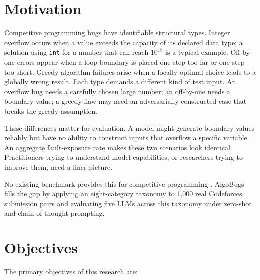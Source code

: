 \section{Motivation}

Competitive programming bugs have identifiable structural types. Integer overflow occurs when a value exceeds the capacity of its declared data type; a solution using \texttt{int} for a number that can reach $10^{18}$ is a typical example. Off-by-one errors appear when a loop boundary is placed one step too far or one step too short. Greedy algorithm failures arise when a locally optimal choice leads to a globally wrong result. Each type demands a different kind of test input. An overflow bug needs a carefully chosen large number; an off-by-one needs a boundary value; a greedy flaw may need an adversarially constructed case that breaks the greedy assumption.

These differences matter for evaluation. A model might generate boundary values reliably but have no ability to construct inputs that overflow a specific variable. An aggregate fault-exposure rate makes these two scenarios look identical. Practitioners trying to understand model capabilities, or researchers trying to improve them, need a finer picture.

No existing benchmark provides this for competitive programming \cite{yang2025testcase, cao2025tcgbench, dong2024survey}. AlgoBugs fills the gap by applying an eight-category taxonomy to 1,000 real Codeforces submission pairs and evaluating five LLMs across this taxonomy under zero-shot and chain-of-thought prompting.

\section{Objectives}

The primary objectives of this research are:

